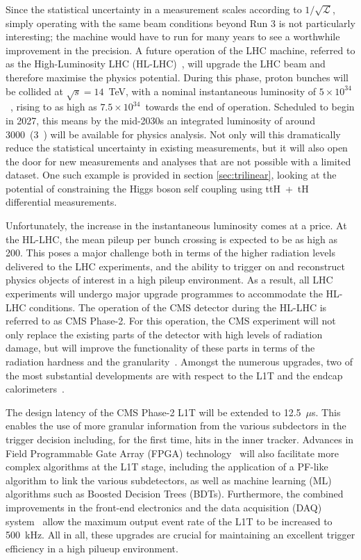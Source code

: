 Since the statistical uncertainty in a measurement scales according to $1/\sqrt{\mathcal{L}}$, simply operating with the same beam conditions beyond Run 3 is not particularly interesting; the machine would have to run for many years to see a worthwhile improvement in the precision. A future operation of the LHC machine, referred to as the High-Luminosity LHC (HL-LHC)~\cite{}, will upgrade the LHC beam and therefore maximise the physics potential. During this phase, proton bunches will be collided at $\sqrt{s}=14$~TeV, with a nominal instantaneous luminosity of $5\times10^{34}$~\lumi, rising to as high as $7.5\times10^{34}$~\lumi towards the end of operation. Scheduled to begin in 2027, this means by the mid-2030s an integrated luminosity of around 3000~\fbinv (3~\abinv) will be available for physics analysis. Not only will this dramatically reduce the statistical uncertainty in existing measurements, but it will also open the door for new measurements and analyses that are not possible with a limited dataset. One such example is provided in section \ref{sec:trilinear}, looking at the potential of constraining the Higgs boson self coupling using ttH~+~tH differential measurements.

Unfortunately, the increase in the instantaneous luminosity comes at a price. At the HL-LHC, the mean pileup per bunch crossing is expected to be as high as 200. This poses a major challenge both in terms of the higher radiation levels delivered to the LHC experiments, and the ability to trigger on and reconstruct physics objects of interest in a high pileup environment. As a result, all LHC experiments will undergo major upgrade programmes to accommodate the HL-LHC conditions. The operation of the CMS detector during the HL-LHC is referred to as CMS Phase-2. For this operation, the CMS experiment will not only replace the existing parts of the detector with high levels of radiation damage, but will improve the functionality of these parts in terms of the radiation hardness and the granularity~\cite{}. Amongst the numerous upgrades, two of the most substantial developments are with respect to the L1T and the endcap calorimeters~\cite{}.

The design latency of the CMS Phase-2 L1T will be extended to 12.5~$\mu$s. This enables the use of more granular information from the various subdectors in the trigger decision including, for the first time, hits in the inner tracker. Advances in Field Programmable Gate Array (FPGA) technology~\cite{}  will also facilitate more complex algorithms at the L1T stage, including the application of a PF-like algorithm to link the various subdetectors, as well as machine learning (ML) algorithms such as Boosted Decision Trees (BDTs). Furthermore, the combined improvements in the front-end electronics and the data acquisition (DAQ) system~\cite{} allow the maximum output event rate of the L1T to be increased to 500~kHz. All in all, these upgrades are crucial for maintaining an excellent trigger efficiency in a high pilueup environment.

